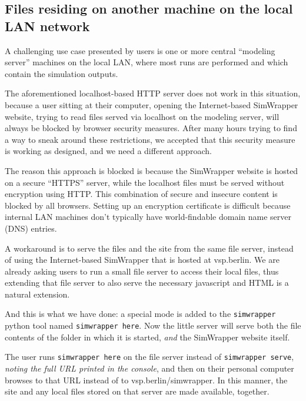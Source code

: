 \documentclass[3p,times,procedia]{elsarticle}
\begin{document}

\subsection{Files residing on another machine on the local LAN network}

A challenging use case presented by users is one or more central
``modeling server'' machines on the local LAN, where most runs are
performed and which contain the simulation outputs.

The aforementioned localhost-based HTTP server does not work in this
situation, because a user sitting at their computer, opening the
Internet-based SimWrapper website, trying to read files served via
localhost on the modeling server, will always be blocked by browser
security measures. After many hours trying to find a way to sneak around
these restrictions, we accepted that this security measure is working as
designed, and we need a different approach.

The reason this approach is blocked is because the SimWrapper website is
hosted on a secure ``HTTPS'' server, while the localhost files must be
served without encryption using HTTP. This combination of secure and insecure
content is blocked by all browsers. Setting up an encryption
certificate is difficult because internal LAN machines don't typically
have world-findable domain name server (DNS) entries.

A workaround is to serve the files and the site from the same file
server, instead of using the Internet-based SimWrapper that is hosted at
vsp.berlin. We are already asking users to run a small file server to
access their local files, thus extending that file server to also serve
the necessary javascript and HTML is a natural extension.

And this is what we have done: a special mode is added to the
\texttt{simwrapper} python tool named \texttt{simwrapper\ here}. Now the
little server will serve both the file contents of the folder in which
it is started, \emph{and} the SimWrapper website itself.

The user runs \texttt{simwrapper\ here} on the file server instead of
\texttt{simwrapper\ serve}, \emph{noting the full URL printed in the
console}, and then on their personal computer browses to that URL
instead of to vsp.berlin/simwrapper. In this manner, the site and any
local files stored on that server are made available, together.
\end{document}
